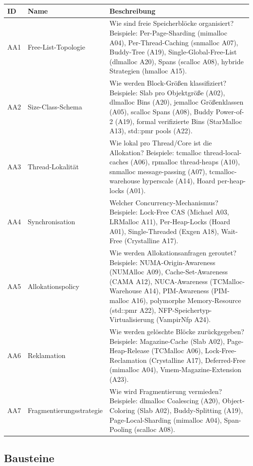 \begin{scriptsize}
\begin{longtable}{@{}>{\raggedright\arraybackslash}p{1.8cm} >{\raggedright\arraybackslash}p{3.2cm} >{\raggedright\arraybackslash}p{8.5cm}@{}}
\toprule
ID & Name & Beschreibung \\
\midrule
\endhead%
AA1 & Free-List-Topologie & Wie sind freie Speicherblöcke organisiert? Beispiele: Per-Page-Sharding (mimalloc A04), Per-Thread-Caching (snmalloc A07), Buddy-Tree (A19), Single-Global-Free-List (dlmalloc A20), Spans (scalloc A08), hybride Strategien (hmalloc A15). \\
AA2 & Size-Class-Schema & Wie werden Block-Größen klassifiziert? Beispiele: Slab pro Objektgröße (A02), dlmalloc Bins (A20), jemalloc Größenklassen (A05), scalloc Spans (A08), Buddy Power-of-2 (A19), formal verifizierte Bins (Star\allowbreak{}Malloc A13), std::pmr pools (A22). \\
AA3 & Thread-Lokalität & Wie lokal pro Thread/\allowbreak{}Core ist die Allokation? Beispiele: tcmalloc thread-local-caches (A06), rpmalloc thread-heaps (A10), snmalloc message-passing (A07), tcmalloc-warehouse hyperscale (A14), Hoard per-heap-locks (A01). \\
AA4 & Synchronisation & Welcher Concurrency-Mechanismus? Beispiele: Lock-Free CAS (Michael A03, LRMalloc A11), Per-Heap-Locks (Hoard A01), Single-Threaded (Exgen A18), Wait-Free (Crystalline A17). \\
AA5 & Allokationspolicy & Wie werden Allokationsanfragen geroutet? Beispiele: NUMA-Origin-Awareness (NUMAlloc A09), Cache-Set-Awareness (CAMA A12), NUCA-Awareness (TCMalloc-Warehouse A14), PIM-Awareness (PIM-malloc A16), polymorphe Memory-Resource (std::pmr A22), NFP-Speichertyp-Virtualisierung (Vampir\allowbreak{}Nfp A24). \\
AA6 & Reklamation & Wie werden gelöschte Blöcke zurückgegeben? Beispiele: Magazine-Cache (Slab A02), Page-Heap-Release (TCMalloc A06), Lock-Free-Reclamation (Crystalline A17), Deferred-Free (mimalloc A04), Vmem-Magazine-Extension (A23). \\
AA7 & Fragmentierungsstrategie & Wie wird Fragmentierung vermieden? Beispiele: dlmalloc Coalescing (A20), Object-Coloring (Slab A02), Buddy-Splitting (A19), Page-Local-Sharding (mimalloc A04), Span-Pooling (scalloc A08). \\
\bottomrule
\end{longtable}
\end{scriptsize}

\subsection*{Bausteine}

